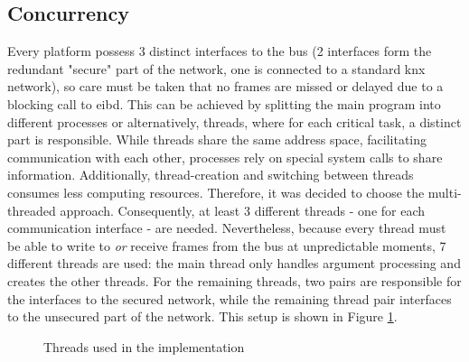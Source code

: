 \subsection{Concurrency}
Every platform possess 3 distinct interfaces to the bus (2 interfaces form the redundant "secure" part of the network, one is connected
to a standard \gls{knx} network), so care must be taken that no frames are missed or delayed due to a blocking call to \gls{eibd}. This can be achieved by splitting the main program into different 
processes or alternatively, threads, where for each critical task, a distinct part is responsible. While threads share the same address space, facilitating communication with
each other, processes rely on special system calls 
to share information. Additionally, thread-creation and switching between threads consumes less computing resources. Therefore, it was decided to choose the multi-threaded
approach. Consequently, at least 3 different threads - one for each communication interface - are needed. Nevertheless, because every thread must be able to write to \textit{or} receive
frames from the bus at unpredictable moments, 7 different threads are used: the main thread only handles argument processing and creates the other threads. For the remaining threads,
two pairs are responsible for the interfaces to the secured network, while the remaining thread pair interfaces to the unsecured part of the network. This setup is shown in
Figure \ref{fig:threads}.
\begin{figure}[h]
\centering
{}
\label{fig:threads}
\caption{Threads used in the implementation}
\end{figure}
